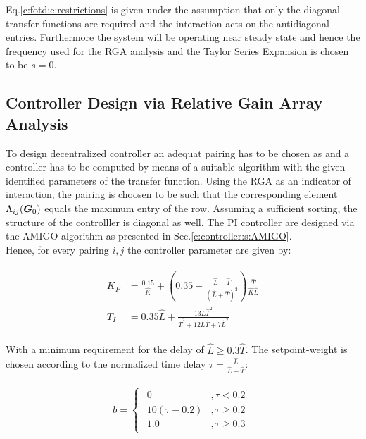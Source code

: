 Eq.\ref{c:fotd:e:restrictions} is given under the assumption that only the diagonal transfer functions are required and the interaction acts on the antidiagonal entries. Furthermore the system will be operating near steady state and hence the frequency used for the RGA analysis and the Taylor Series Expansion is chosen to be $s = 0$.

\subsection{Controller Design via Relative Gain Array Analysis}
\label{c:fotd:su:rga}

To design decentralized controller an adequat pairing has to be chosen as and a controller has to be computed by means of a suitable algorithm with the given identified parameters of the transfer function. Using the RGA as an indicator of interaction, the pairing is choosen to be such that the corresponding element $\Lambda_{ij}(\mbox{\boldmath$G$}_0)$ equals the maximum entry of the row. Assuming a sufficient sorting, the structure of the controlller is diagonal as well. The PI controller are designed via the AMIGO algorithm as presented in Sec.\ref{c:controller:s:AMIGO}.\\

Hence, for every pairing $i,j$ the controller parameter are given by:

\begin{align*}
\begin{split}
K_P &= \frac{0.15}{\hat{K}}+ \left(0.35 - \frac{\hat{L}+\hat{T}}{(\hat{L}+\hat{T})^2}\right) \frac{\hat{T}}{\hat{K}\hat{L}} \\
T_I &= 0.35 \hat{L} + \frac{13 \hat{L}\hat{T}^2}{\hat{T}^2 + 12 \hat{L}\hat{T} + 7 \hat{L}^2}
\end{split}
\end{align*}

With a minimum requirement for the delay of $\hat{L} \geq 0.3 \hat{T}$. The setpoint-weight is chosen according to the normalized time delay $\tau = \frac{\hat{L}}{\hat{L}+\hat{T}}$:

\begin{align*}
b = \begin{cases}
\begin{split}
0 &, \tau < 0.2 \\
10(\tau-0.2) &, \tau \geq 0.2 \\
1.0 &, \tau \geq 0.3
\end{split}
\end{cases}
\end{align*}

